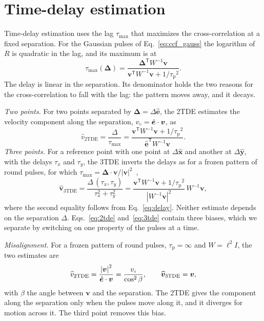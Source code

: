 \documentclass[aps,pre,11pt,a4paper,preprint,amsmath,amssymb,groupedaddress]{revtex4-2}
\newcommand{\Eqref}[1]{Eq.~\eqref{#1}}
\newcommand{\Eqsref}[2]{Eqs.~\eqref{#1} and~\eqref{#2}}
\newcommand{\wh}{\widehat}
\newcommand{\abs}[1]{{\left|#1\right|}}
\newcommand{\bv}{\ensuremath{\bm{v}}}
\newcommand{\bD}{\ensuremath{\bm{\Delta}}}
\newcommand{\bex}{\ensuremath{\hat{\bm{x}}}}
\newcommand{\bey}{\ensuremath{\hat{\bm{y}}}}
\newcommand{\be}{\ensuremath{\hat{\bm{e}}}}
\newcommand{\T}{\ensuremath{\mathsf{T}}}
\newcommand{\taud}{\ensuremath{\tau_\text{p}}}
\newcommand{\taumax}{\ensuremath{\tau_\text{max}}}
\newcommand{\Wi}{\ensuremath{W^{-1}}}
\begin{document}
\section{Time-delay estimation}
\label{sec:tde}

Time-delay estimation uses the lag \taumax{} that maximizes the cross-correlation at a fixed separation. For the Gaussian pulses of \Eqref{eq:ccf_gauss} the logarithm of $R$ is quadratic in the lag, and its maximum is at
%
\begin{equation}
\label{eq:delay}
\taumax(\bD) = \frac{\bD^\T\Wi\bv}{\bv^\T\Wi\bv + 1/\taud^2}.
\end{equation}
%
The delay is linear in the separation. Its denominator holds the two reasons for the cross-correlation to fall with the lag: the pattern moves away, and it decays.

\emph{Two points.} For two points separated by $\bD = \Delta\be$, the 2TDE estimates the velocity component along the separation, $v_\shortparallel = \be\cdot\bv$, as
%
\begin{equation}
\label{eq:2tde}
\wh{v}_\text{2TDE} = \frac{\Delta}{\taumax} = \frac{\bv^\T\Wi\bv + 1/\taud^2}{\be^\T\Wi\bv}.
\end{equation}
%
\emph{Three points.} For a reference point with one point at $\Delta\bex$ and another at $\Delta\bey$, with the delays $\tau_x$ and $\tau_y$, the 3TDE inverts the delays as for a frozen pattern of round pulses, for which $\taumax = \bD\cdot\bv/\abs{\bv}^2$~\cite{losada_three-point_2024},
%
\begin{equation}
\label{eq:3tde}
\wh{\bv}_\text{3TDE} = \frac{\Delta\,(\tau_x, \tau_y)}{\tau_x^2 + \tau_y^2} = \frac{\bv^\T\Wi\bv + 1/\taud^2}{\abs{\Wi\bv}^2}\, \Wi\bv,
\end{equation}
%
where the second equality follows from \Eqref{eq:delay}. Neither estimate depends on the separation $\Delta$. \Eqsref{eq:2tde}{eq:3tde} contain three biases, which we separate by switching on one property of the pulses at a time.

\emph{Misalignment.} For a frozen pattern of round pulses, $\taud = \infty$ and $W = \ell^2 I$, the two estimates are
%
\begin{equation}
\label{eq:misalignment}
\wh{v}_\text{2TDE} = \frac{\abs{\bv}^2}{\be\cdot\bv} = \frac{v_\shortparallel}{\cos^2\beta},
\qquad
\wh{\bv}_\text{3TDE} = \bv,
\end{equation}
%
with $\beta$ the angle between \bv{} and the separation. The 2TDE gives the component along the separation only when the pulses move along it, and it diverges for motion across it. The third point removes this bias.
\end{document}
